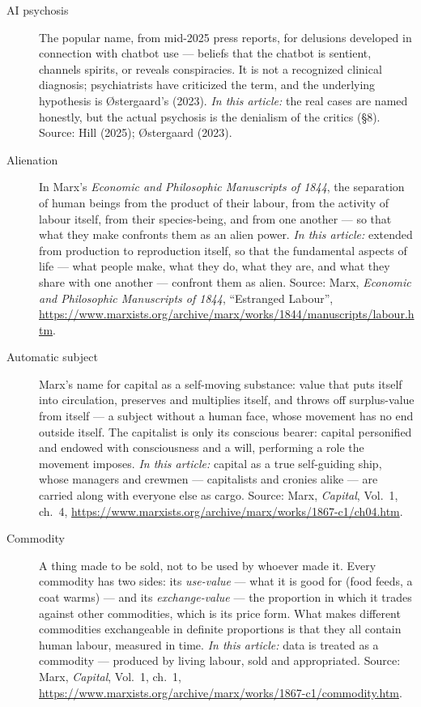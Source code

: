 \documentclass[11pt]{article}
\begin{document}
\begin{description}
\item[AI psychosis] The popular name, from mid-2025 press reports, for
delusions developed in connection with chatbot use --- beliefs that the
chatbot is sentient, channels spirits, or reveals conspiracies. It is
not a recognized clinical diagnosis; psychiatrists have criticized the
term, and the underlying hypothesis is Østergaard's (2023). \emph{In
this article:} the real cases are named honestly, but the actual
psychosis is the denialism of the critics (§8). Source: Hill (2025);
Østergaard (2023).

\item[Alienation] In Marx's \textit{Economic and Philosophic
Manuscripts of 1844}, the separation of human beings from the product
of their labour, from the activity of labour itself, from their
species-being, and from one another --- so that what they make
confronts them as an alien power. \emph{In this article:} extended from
production to reproduction itself, so that the fundamental aspects of
life --- what people make, what they do, what they are, and what they
share with one another --- confront them as alien. Source: Marx,
\textit{Economic and Philosophic Manuscripts of 1844}, ``Estranged
Labour'',
\url{https://www.marxists.org/archive/marx/works/1844/manuscripts/labour.htm}.

\item[Automatic subject] Marx's name for capital as a self-moving
substance: value that puts itself into circulation, preserves and
multiplies itself, and throws off surplus-value from itself --- a
subject without a human face, whose movement has no end outside itself.
The capitalist is only its conscious bearer: capital personified and
endowed with consciousness and a will, performing a role the movement
imposes. \emph{In this article:} capital as a true self-guiding ship,
whose managers and crewmen --- capitalists and cronies alike --- are
carried along with everyone else as cargo. Source: Marx,
\textit{Capital}, Vol.~1, ch.~4,
\url{https://www.marxists.org/archive/marx/works/1867-c1/ch04.htm}.

\item[Commodity] A thing made to be sold, not to be used by whoever
made it. Every commodity has two sides: its \emph{use-value} --- what
it is good for (food feeds, a coat warms) --- and its
\emph{exchange-value} --- the proportion in which it trades against
other commodities, which is its price form. What makes different
commodities exchangeable in definite proportions is that they all
contain human labour, measured in time. \emph{In this article:} data
is treated as a commodity --- produced by living labour, sold and
appropriated. Source: Marx, \emph{Capital}, Vol.~1, ch.~1,
\url{https://www.marxists.org/archive/marx/works/1867-c1/commodity.htm}.


\end{description}
\end{document}
